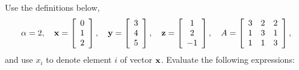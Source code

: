     Use the definitions below,
    \[
    \alpha = 2,\quad
    \mathbf{x} = \left[\begin{array}{c}
    0\\
    1\\
    2\\
    \end{array}\right], \quad 
    \mathbf{y} = \left[\begin{array}{c}
    3\\
    4\\
    5\\
    \end{array}\right],\quad
    \textbf{z} = \left[\begin{array}{c}
    1\\
    2\\
    -1\\
    \end{array}\right],\quad
    A = \left[\begin{array}{ccc}
    3 & 2 & 2\\
    1 & 3 & 1\\
    1 & 1 & 3
    \end{array}\right],
    \]
    and use $x_i$ to denote element $i$ of vector $\mathbf{x}$.
    Evaluate the following expressions:
